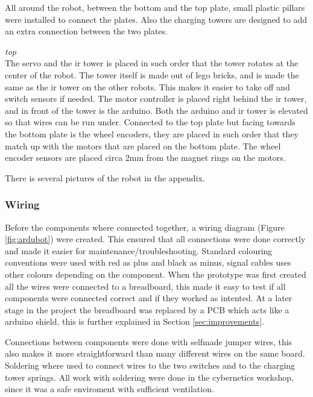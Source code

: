 All around the robot, between the bottom and the top plate, small plastic pillars were installed to connect the plates. Also the charging towers are designed to add an extra connection between the two plates.

\textit{top}
\\
The servo and the \acrshort{ir} tower is placed in such order that the tower rotates at the center of the robot. The tower itself is made out of lego bricks, and is made the same as the \acrshort{ir} tower on the other robots. This makes it easier to take off and switch sensors if needed. The motor controller is placed right behind the \acrshort{ir} tower, and in front of the tower is the arduino. Both the arduino and \acrshort{ir} tower is elevated so that wires can be run under. Connected to the top plate but facing towards the bottom plate is the wheel encoders, they are placed in such order that they match up with the motors that are placed on the bottom plate. The wheel encoder sensors are placed circa 2mm from the magnet rings on the motors.

There is several pictures of the robot in the appendix.

\subsubsection{Wiring}
Before the components where connected together, a wiring diagram (Figure \ref{fig:ardubot}) were created. This ensured that all connections were done correctly and made it easier for maintenance/troubleshooting. Standard colouring conventions were used with red as plus and black as minus, signal cables uses other colours depending on the component. When the prototype was first created all the wires were connected to a breadboard, this made it easy to test if all components were connected correct and if they worked as intented. At a later stage in the project the breadboard was replaced by a PCB which acts like a arduino shield, this is further explained in Section \ref{sec:improvements}.

Connections between components were done with selfmade jumper wires, this also makes it more straightforward than many different wires on the same board. Soldering where used to connect wires to the two switches and to the charging tower springs. All work with soldering were done in the cybernetics workshop, since it was a safe enviroment with sufficient ventilation.